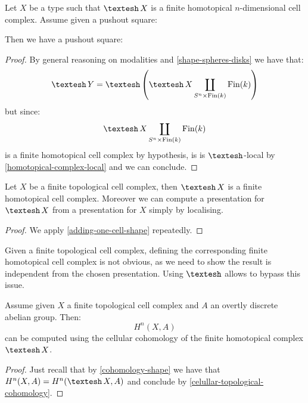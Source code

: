 \begin{lemma}\label{adding-one-cell-shape}
Let $X$ be a type such that $\shape X$ is a finite homotopical $n$-dimensional cell complex. Assume given a pushout square:
\begin{center}
\end{center}
Then we have a pushout square:
\begin{center}
\end{center}
\end{lemma}

\begin{proof}
By general reasoning on modalities and \cref{shape-spheres-disks} we have that:
\[\shape Y = \shape\left(\shape X \coprod_{S^n\times \mathrm{Fin}(k)} \mathrm{Fin}(k)\right)\]
but since:
\[\shape X \coprod_{S^n\times \mathrm{Fin}(k)} \mathrm{Fin}(k)\]
is a finite homotopical cell complex by hypothesis, is is $\shape$-local by \cref{homotopical-complex-local} and we can conclude.
\end{proof}

\begin{lemma}\label{celullar-topological-cohomology}
Let $X$ be a finite topological cell complex, then $\shape X$ is a finite homotopical cell complex. Moreover we can compute a presentation for $\shape X$ from a presentation for $X$ simply by localising.
\end{lemma}

\begin{proof}
We apply \cref{adding-one-cell-shape} repeatedly.
\end{proof}

\begin{remark}
Given a finite topological cell complex, defining the corresponding finite homotopical cell complex is not obvious, as we need to show the result is independent from the chosen presentation. Using $\shape$ allows to bypass this issue.
\end{remark}

\begin{corollary}
Assume given $X$ a finite topological cell complex and $A$ an overtly discrete abelian group. Then:
\[H^n(X,A)\]
can be computed using the cellular cohomology of the finite homotopical complex $\shape X$.
\end{corollary}

\begin{proof}
Just recall that by \cref{cohomology-shape} we have that $H^n(X,A) = H^n(\shape X,A)$ and conclude by \cref{celullar-topological-cohomology}.
\end{proof}


